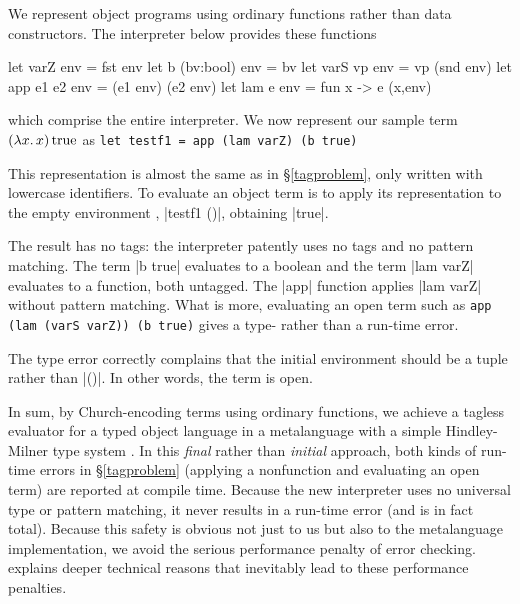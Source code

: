 We represent object programs using ordinary functions rather than
data constructors.  The interpreter below provides these functions
\begin{code4}
let varZ env    = fst env       let b (bv:bool) env = bv
let varS vp env = vp (snd env)  let app e1 e2 env   = (e1 env) (e2 env)
let lam e env   = fun x -> e (x,env)
\end{code4}
which comprise the entire interpreter.
We now represent our sample term $(\mathopen{\lambda\mathord{x}.\,}x)\mathinner{\mathrm{true}}$ as
\texttt{let testf1 = app (lam varZ) (b true)}
\begin{comment}
\begin{code}
let testf1 = app (lam varZ) (b true)
\end{code}
\end{comment}
This representation is almost the same as in \S\ref{tagproblem}, only
written with lowercase identifiers. To evaluate an object term is to
apply its representation to the empty environment%
, |testf1 ()|, obtaining |true|.
\begin{comment}
\begin{code}
let testf1r = testf1 ()
val testf1r : bool = true
\end{code}
\end{comment}
The result has no tags: the interpreter patently uses no tags and no
pattern matching. The term |b true| evaluates to a boolean and the term
|lam varZ| evaluates to a function, both untagged. The |app| function
applies |lam varZ| without pattern matching. What is more, evaluating an
open term such as \texttt{app (lam (varS varZ)) (b true)}
gives a type- rather than a run-time error.
\begin{comment}
\begin{code}
open term such as |testf3| below gives a type error rather than
a run-time error
let testf3 = app (lam (varS varZ)) (b true)
let testf3r = testf3 ()
\end{code}
\end{comment}
The type error correctly complains
that the initial environment should be a tuple rather than |()|.
In other words, the term is open.

In sum, by Church\hyp encoding terms using ordinary functions, we
achieve a tagless evaluator for a typed object language in a
metalanguage with a simple 
Hindley-Milner type system
.  In this \emph{final} rather
than \emph{initial} approach, both kinds of run-time errors in
\S\ref{tagproblem} (applying a nonfunction and evaluating an open
term) are reported at compile time. Because the new interpreter
uses no universal type or pattern matching, it never results in a
run-time error (and is in fact total).  Because this safety is obvious
not just to us but also to the metalanguage implementation, we avoid
the serious performance penalty \cite{WalidICFP02} of error checking.
 explains deeper technical reasons that
inevitably lead to these performance penalties.

